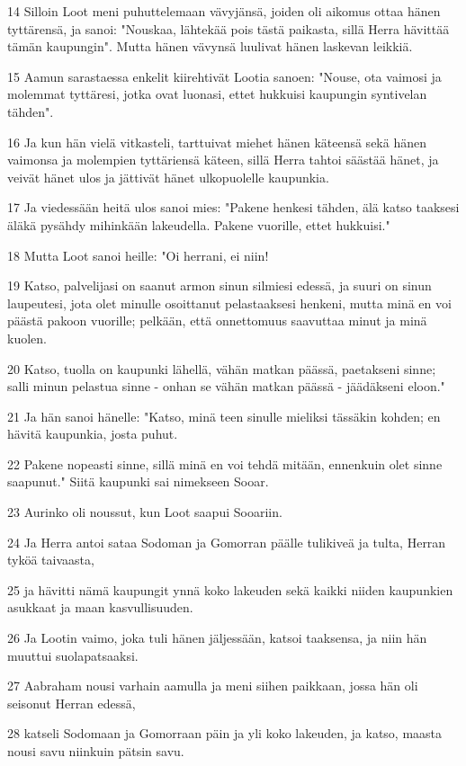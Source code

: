 \par 14 Silloin Loot meni puhuttelemaan vävyjänsä, joiden oli aikomus ottaa hänen tyttärensä, ja sanoi: "Nouskaa, lähtekää pois tästä paikasta, sillä Herra hävittää tämän kaupungin". Mutta hänen vävynsä luulivat hänen laskevan leikkiä.
\par 15 Aamun sarastaessa enkelit kiirehtivät Lootia sanoen: "Nouse, ota vaimosi ja molemmat tyttäresi, jotka ovat luonasi, ettet hukkuisi kaupungin syntivelan tähden".
\par 16 Ja kun hän vielä vitkasteli, tarttuivat miehet hänen käteensä sekä hänen vaimonsa ja molempien tyttäriensä käteen, sillä Herra tahtoi säästää hänet, ja veivät hänet ulos ja jättivät hänet ulkopuolelle kaupunkia.
\par 17 Ja viedessään heitä ulos sanoi mies: "Pakene henkesi tähden, älä katso taaksesi äläkä pysähdy mihinkään lakeudella. Pakene vuorille, ettet hukkuisi."
\par 18 Mutta Loot sanoi heille: "Oi herrani, ei niin!
\par 19 Katso, palvelijasi on saanut armon sinun silmiesi edessä, ja suuri on sinun laupeutesi, jota olet minulle osoittanut pelastaaksesi henkeni, mutta minä en voi päästä pakoon vuorille; pelkään, että onnettomuus saavuttaa minut ja minä kuolen.
\par 20 Katso, tuolla on kaupunki lähellä, vähän matkan päässä, paetakseni sinne; salli minun pelastua sinne - onhan se vähän matkan päässä - jäädäkseni eloon."
\par 21 Ja hän sanoi hänelle: "Katso, minä teen sinulle mieliksi tässäkin kohden; en hävitä kaupunkia, josta puhut.
\par 22 Pakene nopeasti sinne, sillä minä en voi tehdä mitään, ennenkuin olet sinne saapunut." Siitä kaupunki sai nimekseen Sooar.
\par 23 Aurinko oli noussut, kun Loot saapui Sooariin.
\par 24 Ja Herra antoi sataa Sodoman ja Gomorran päälle tulikiveä ja tulta, Herran tyköä taivaasta,
\par 25 ja hävitti nämä kaupungit ynnä koko lakeuden sekä kaikki niiden kaupunkien asukkaat ja maan kasvullisuuden.
\par 26 Ja Lootin vaimo, joka tuli hänen jäljessään, katsoi taaksensa, ja niin hän muuttui suolapatsaaksi.
\par 27 Aabraham nousi varhain aamulla ja meni siihen paikkaan, jossa hän oli seisonut Herran edessä,
\par 28 katseli Sodomaan ja Gomorraan päin ja yli koko lakeuden, ja katso, maasta nousi savu niinkuin pätsin savu.
